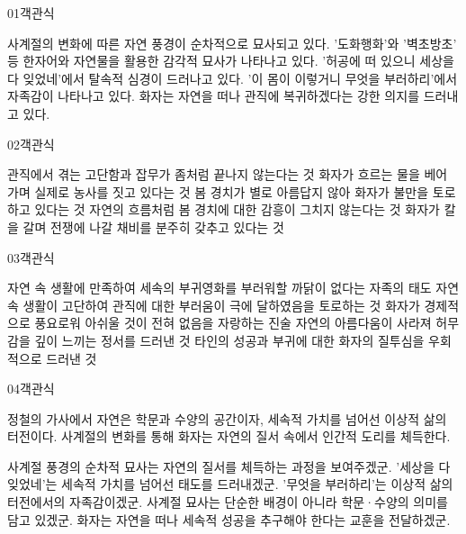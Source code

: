 \documentclass[fs85,seriesWit]{korfarm-base}
\begin{document}
\kfBeginMC
\begin{kfQBlock}{01}{객관식}
\begin{kfChoices}
\kfChoice 사계절의 변화에 따른 자연 풍경이 순차적으로 묘사되고 있다.
\kfChoice '도화행화'와 '벽초방초' 등 한자어와 자연물을 활용한 감각적 묘사가 나타나고 있다.
\kfChoice '허공에 떠 있으니 세상을 다 잊었네'에서 탈속적 심경이 드러나고 있다.
\kfChoice '이 몸이 이렇거니 무엇을 부러하리'에서 자족감이 나타나고 있다.
\kfChoice 화자는 자연을 떠나 관직에 복귀하겠다는 강한 의지를 드러내고 있다.
\end{kfChoices}
\end{kfQBlock}

\begin{kfQBlock}{02}{객관식}
\begin{kfChoices}
\kfChoice 관직에서 겪는 고단함과 잡무가 좀처럼 끝나지 않는다는 것
\kfChoice 화자가 흐르는 물을 베어 가며 실제로 농사를 짓고 있다는 것
\kfChoice 봄 경치가 별로 아름답지 않아 화자가 불만을 토로하고 있다는 것
\kfChoice 자연의 흐름처럼 봄 경치에 대한 감흥이 그치지 않는다는 것
\kfChoice 화자가 칼을 갈며 전쟁에 나갈 채비를 분주히 갖추고 있다는 것
\end{kfChoices}
\end{kfQBlock}

\begin{kfQBlock}{03}{객관식}
\begin{kfChoices}
\kfChoice 자연 속 생활에 만족하여 세속의 부귀영화를 부러워할 까닭이 없다는 자족의 태도
\kfChoice 자연 속 생활이 고단하여 관직에 대한 부러움이 극에 달하였음을 토로하는 것
\kfChoice 화자가 경제적으로 풍요로워 아쉬울 것이 전혀 없음을 자랑하는 진술
\kfChoice 자연의 아름다움이 사라져 허무감을 깊이 느끼는 정서를 드러낸 것
\kfChoice 타인의 성공과 부귀에 대한 화자의 질투심을 우회적으로 드러낸 것
\end{kfChoices}
\end{kfQBlock}

\begin{kfQBlock}{04}{객관식}
\begin{kfEvidence}정철의 가사에서 자연은 학문과 수양의 공간이자, 세속적 가치를 넘어선 이상적 삶의 터전이다. 사계절의 변화를 통해 화자는 자연의 질서 속에서 인간적 도리를 체득한다.\end{kfEvidence}
\begin{kfChoices}
\kfChoice 사계절 풍경의 순차적 묘사는 자연의 질서를 체득하는 과정을 보여주겠군.
\kfChoice '세상을 다 잊었네'는 세속적 가치를 넘어선 태도를 드러내겠군.
\kfChoice '무엇을 부러하리'는 이상적 삶의 터전에서의 자족감이겠군.
\kfChoice 사계절 묘사는 단순한 배경이 아니라 학문·수양의 의미를 담고 있겠군.
\kfChoice 화자는 자연을 떠나 세속적 성공을 추구해야 한다는 교훈을 전달하겠군.
\end{kfChoices}
\end{kfQBlock}
\end{document}
